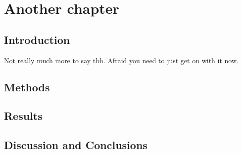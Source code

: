 \chapter[Another chapter]{Another chapter}
\label{ch:chapter3}

\section{Introduction}

Not really much more to say tbh. Afraid you need to just get on with it now.

\section{Methods}

\section{Results}

\section{Discussion and Conclusions}